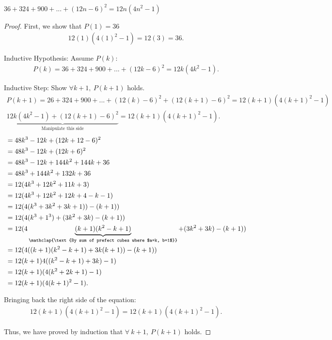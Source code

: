 \documentclass{report}
\begin{document}
    \pagebreak \bigbreak \noindent 
    \begin{prop}
       $36+324+900+...+(12n-6)^{2} = 12n(4n^{2}-1)$ 
    \end{prop}
    \bigbreak \noindent 
    \begin{proof}
        First, we show that $P(1) = 36$
        \begin{align*}
           12(1)(4(1)^{2}-1) = 12(3) = 36
        .\end{align*}
        \bigbreak \noindent 

        Inductive Hypothesis: Assume $P(k)$:
        \begin{align*}
           P(k) = 36+324+900+...+(12k-6)^{2} = 12k(4k^{2}-1) 
        .\end{align*}
        \bigbreak \noindent 

        Inductive Step: Show $\forall k+1,\ P(k+1)$ holds.
        \begin{align*}
            P(k+1) = 26 + 324 + 900 + ... + (12(k)-6)^{2} + (12(k+1)-6)^{2} = 12(k+1)(4(k+1)^{2}-1) \\
            \underbrace{12k(4k^{2}-1) + (12(k+1)-6)^{2}}_{\text{Manipulate this side}} = 12(k+1)(4(k+1)^{2}-1) 
        .\end{align*}
        \begin{align*}
            &=48k^{3}-12k+(12k+12-6)^{2} \\
            &=48k^{3}-12k+(12k+6)^{2} \\
            &=48k^{3}-12k+144k^{2}+144k+36\\
            &=48k^{3}+144k^{2}+132k+36 \\
            &=12(4k^{3}+12k^{2}+11k+3) \\
            &=12(4k^{3}+12k^{2}+12k+4-k-1) \\
            &=12(4(k^{3}+3k^{2}+3k+1))-(k+1)) \\
            &= 12(4(k^{3}+1^{3})+(3k^{2}+3k)-(k+1)) \\
            &=12(4\underbrace{(k+1)(k^{2}-k+1)}_{\mathclap{\text{By sum of prefect cubes where $a=k, b=1$}}}+(3k^{2}+3k)-(k+1)) \\
            &=12(4((k+1)(k^{2}-k+1)+3k(k+1))-(k+1)) \\
            &=12(k+1)4((k^{2}-k+1)+3k)-1) \\
            &=12(k+1)(4(k^{2}+2k+1)-1) \\
            &=12(k+1)(4(k+1)^{2}-1)
        .\end{align*}
        \bigbreak \noindent 
        
        Bringing back the right side of the equation:
        \begin{align*}
            12(k+1)(4(k+1)^{2}-1) = 12(k+1)(4(k+1)^{2}-1)
        .\end{align*}

        Thus, we have proved by induction that $\forall\ k+1,\ P(k+1)$ holds. 
    \end{proof}
\end{document}
